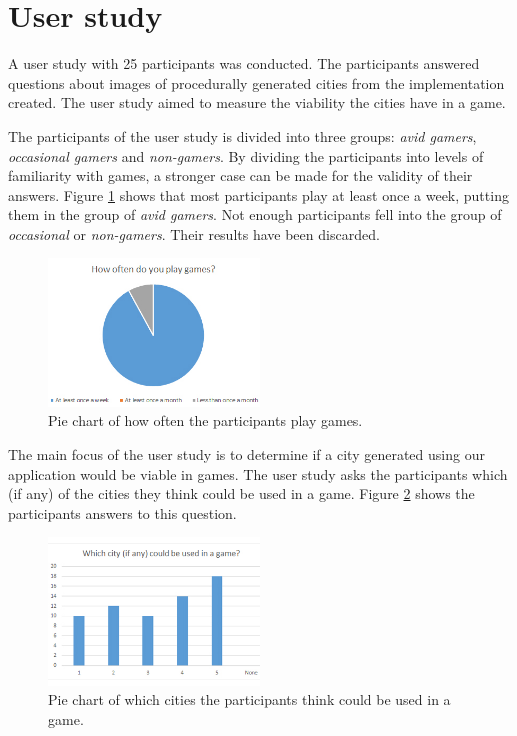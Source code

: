 \section{User study}
A user study with 25 participants was conducted. The participants answered questions about images of procedurally generated cities from the implementation created. The user study aimed to measure the viability the cities have in a game.

\par
The participants of the user study is divided into three groups: \textit{avid gamers}, \textit{occasional gamers} and \textit{non-gamers}. By dividing the participants into levels of familiarity with games, a stronger case can be made for the validity of their answers. Figure \ref{fig:pie-chart-often-play} shows that most participants play at least once a week, putting them in the group of \textit{avid gamers}. Not enough participants fell into the group of \textit{occasional} or \textit{non-gamers}. Their results have been discarded.

\begin{figure}[h]
	\centering
	\includegraphics[width=0.5\textwidth]{"Images/OftenPlay"}
	\caption{Pie chart of how often the participants play games.}
	\label{fig:pie-chart-often-play}
\end{figure}

The main focus of the user study is to determine if a city generated using our application would be viable in games. The user study asks the participants which (if any) of the cities they think could be used in a game. Figure \ref{fig:pie-chart-use-in-game} shows the participants answers to this question.

\begin{figure}[h]
	\centering
	\includegraphics[width=0.5\textwidth]{"Images/UseInGame"}
	\caption{Pie chart of which cities the participants think could be used in a game.}
	\label{fig:pie-chart-use-in-game}
\end{figure}

